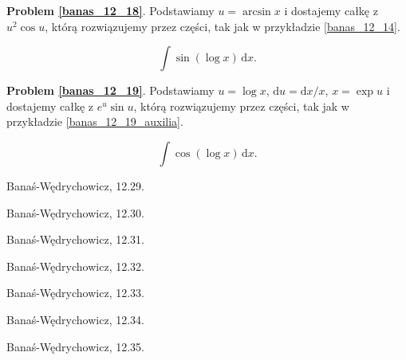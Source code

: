 \textbf{Problem \ref{banas_12_18}}. %
Podstawiamy $u = \arcsin x$ i dostajemy całkę z $u^2 \cos u$, którą rozwiązujemy przez części, tak jak w przykładzie \ref{banas_12_14}. %

\begin{problem}
    \label{banas_12_19}%
    \begin{equation}
        \int \sin(\log x) \, \mathrm{d}x.
    \end{equation}
\end{problem}

\textbf{Problem \ref{banas_12_19}}. %
Podstawiamy $u = \log x$, $\mathrm{d} u = \mathrm{d} x / x$, $x = \exp u$ i dostajemy całkę z $e^u \sin u$, którą rozwiązujemy przez części, tak jak w przykładzie \ref{banas_12_19_auxilia}. %

\begin{problem}
    \label{banas_12_20}%
    \begin{equation}
        \int \cos(\log x) \, \mathrm{d}x.
    \end{equation}
\end{problem}    

\begin{problem}
    Banaś-Wędrychowicz, 12.29.
\end{problem}

\begin{problem}
    Banaś-Wędrychowicz, 12.30.
\end{problem}

\begin{problem}
    Banaś-Wędrychowicz, 12.31.
\end{problem}

\begin{problem}
    Banaś-Wędrychowicz, 12.32.
\end{problem}

\begin{problem}
    Banaś-Wędrychowicz, 12.33.
\end{problem}

\begin{problem}
    Banaś-Wędrychowicz, 12.34.
\end{problem}

\begin{problem}
    Banaś-Wędrychowicz, 12.35.
\end{problem}


